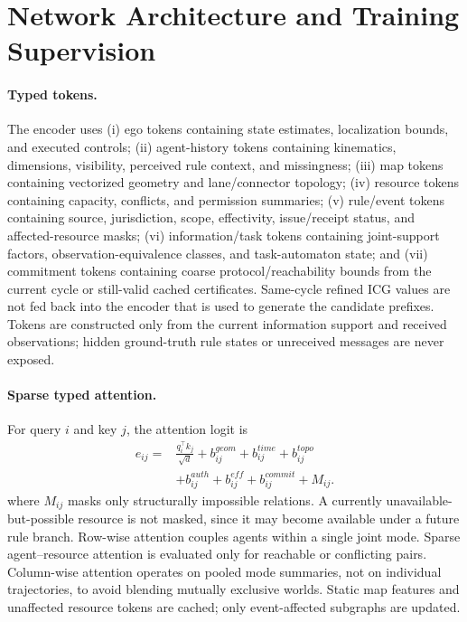 \documentclass[letterpaper]{article} %
\begin{document}
\section{Network Architecture and Training Supervision}
\label{app:network}
\paragraph{Typed tokens.}
The encoder uses (i) ego tokens containing state estimates, localization bounds, and executed controls; (ii) agent-history tokens containing kinematics, dimensions, visibility, perceived rule context, and missingness; (iii) map tokens containing vectorized geometry and lane/connector topology; (iv) resource tokens containing capacity, conflicts, and permission summaries; (v) rule/event tokens containing source, jurisdiction, scope, effectivity, issue/receipt status, and affected-resource masks; (vi) information/task tokens containing joint-support factors, observation-equivalence classes, and task-automaton state; and (vii) commitment tokens containing coarse protocol/reachability bounds from the current cycle or still-valid cached certificates. Same-cycle refined ICG values are not fed back into the encoder that is used to generate the candidate prefixes. Tokens are constructed only from the current information support and received observations; hidden ground-truth rule states or unreceived messages are never exposed.

\paragraph{Sparse typed attention.}
For query $i$ and key $j$, the attention logit is
\begin{equation}
\begin{aligned}
e_{ij}={}&\frac{q_i^\top k_j}{\sqrt d}+b_{ij}^{geom}+b_{ij}^{time}+b_{ij}^{topo}\\
&+b_{ij}^{auth}+b_{ij}^{eff}+b_{ij}^{commit}+M_{ij}.
\end{aligned}
\label{eq:typed-attn}
\end{equation}
where $M_{ij}$ masks only structurally impossible relations. A currently unavailable-but-possible resource is not masked, since it may become available under a future rule branch. Row-wise attention couples agents within a single joint mode. Sparse agent--resource attention is evaluated only for reachable or conflicting pairs. Column-wise attention operates on pooled mode summaries, not on individual trajectories, to avoid blending mutually exclusive worlds. Static map features and unaffected resource tokens are cached; only event-affected subgraphs are updated.
\end{document}
